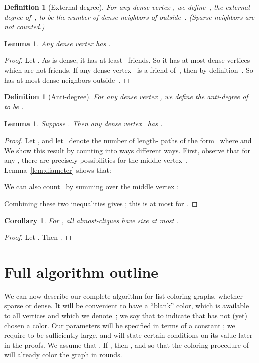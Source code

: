 \documentclass[11pt]{amsart}
\newtheorem{lemma}[theorem]{Lemma}
\newtheorem{corollary}[theorem]{Corollary}
\newtheorem{definition}[theorem]{Definition}
\begin{document}
\begin{definition}[External degree]
For any dense vertex , we define~, the \emph{external degree} of~, to be the number of \emph{dense} neighbors of  outside~. (Sparse neighbors are not counted.)
\end{definition}

\begin{lemma}
\label{network1}
Any dense vertex  has .
\end{lemma}
\begin{proof}
Let . As  is dense, it has at least~ friends. So it has at most  dense vertices which are not friends.  If any dense vertex~ is a friend of~, then by definition~. So  has at most  dense neighbors outside~.
\end{proof}

\begin{definition}[Anti-degree]
For any dense vertex , we define the \emph{anti-degree} of  to be .
\end{definition}

\begin{lemma}
\label{network2}
Suppose . Then any dense vertex~ has .
\end{lemma}
\begin{proof}
Let , and let~ denote the number of length- paths of the form~ where  and  We show this result by counting  into ways different ways. First, observe that for any , there are precisely  possibilities for the middle vertex~. Lemma~\ref{lem:diameter} shows that:


We can also count~ by summing over the middle vertex :

Combining these two inequalities gives ; this is at most  for .
\end{proof}

\begin{corollary}
For , all almost-cliques have size at most .
\end{corollary}
\begin{proof}
Let . Then .
\end{proof}


\section{Full algorithm outline}
\label{full-algorithm-sec}
We can now describe our complete algorithm for list-coloring graphs, whether sparse or dense. It will be convenient to have a ``blank'' color, which is available to all vertices and which we denote~; we say that  to indicate that  has not (yet) chosen a color. Our parameters will be specified in terms of a constant ; we require  to be sufficiently large, and will state certain conditions on its value later in the proofs. We assume that . If , then , and so that the coloring procedure of~\cite{BEPS16} will already color the graph in  rounds.
\end{document}
